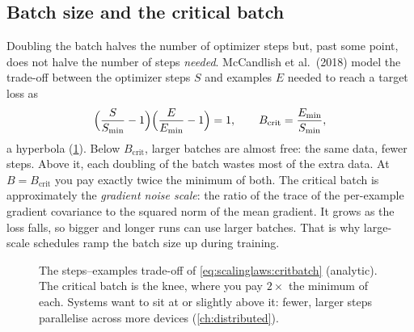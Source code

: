 \subsection{Batch size and the critical batch}\label{sec:scalinglaws:batch}

Doubling the batch halves the number of optimizer steps but, past some point, does not halve
the number of steps \emph{needed}. McCandlish et al.\ (2018) model the trade-off between the
optimizer steps $S$ and examples $E$ needed to reach a target loss as
\begin{equation}
\Bigl(\frac{S}{S_{\min}}-1\Bigr)\Bigl(\frac{E}{E_{\min}}-1\Bigr) = 1,
\qquad B_{\text{crit}} = \frac{E_{\min}}{S_{\min}},
\label{eq:scalinglaws:critbatch}
\end{equation}
a hyperbola (\cref{fig:scalinglaws:critbatch}). Below $B_{\text{crit}}$, larger batches are
almost free: the same data, fewer steps. Above it, each doubling of the batch wastes most of
the extra data. At $B=B_{\text{crit}}$ you pay exactly twice the minimum of both. The critical
batch is approximately the \emph{gradient noise scale}: the ratio of the trace of the per-example
gradient covariance to the squared norm of the mean gradient. It grows as the loss falls, so
bigger and longer runs can use larger batches. That is why large-scale schedules ramp the
batch size up during training.

\begin{figure}[t]
\centering
{}
\caption{The steps--examples trade-off of \cref{eq:scalinglaws:critbatch} (analytic). The
critical batch is the knee, where you pay $2\times$ the minimum of each. Systems want to sit at
or slightly above it: fewer, larger steps parallelise across more devices (\cref{ch:distributed}).}
\label{fig:scalinglaws:critbatch}
\end{figure}

